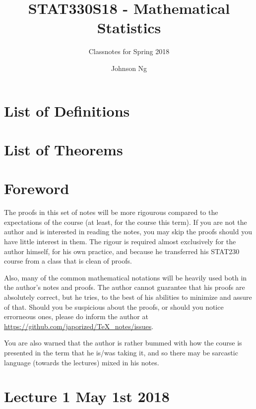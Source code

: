 \documentclass[notoc,notitlepage]{tufte-book}
\title{STAT330S18 - Mathematical Statistics}
\author{Johnson Ng}
\subtitle{Classnotes for Spring 2018}
\begin{document}
\hypersetup{pageanchor=false}
\maketitle
\hypersetup{pageanchor=true}
\tableofcontents

\chapter*{\faBook \enspace List of Definitions}

\chapter*{\faPaperclip \enspace List of Theorems}

\chapter*{Foreword}
  \label{chapter:foreword}

\begin{fullwidth}
  The proofs in this set of notes will be more rigourous compared to the expectations of the course (at least, for the course this term). If you are not the author and is interested in reading the notes, you may skip the proofs should you have little interest in them. The rigour is required almost exclusively for the author himself, for his own practice, and because he transferred his STAT230 course from a class that is clean of proofs.

  Also, many of the common mathematical notations will be heavily used both in the author's notes and proofs. The author cannot guarantee that his proofs are absolutely correct, but he tries, to the best of his abilities to minimize and assure of that. Should you be suspicious about the proofs, or should you notice errorneous ones, please do inform the author at \url{https://github.com/japorized/TeX_notes/issues}.

  You are also warned that the author is rather bummed with how the course is presented in the term that he is/was taking it, and so there may be sarcastic language (towards the lectures) mixed in his notes.
\end{fullwidth}


\chapter{Lecture 1 May 1st 2018}
  \label{chapter:lecture_1_may_1st_2018}
\end{document}

